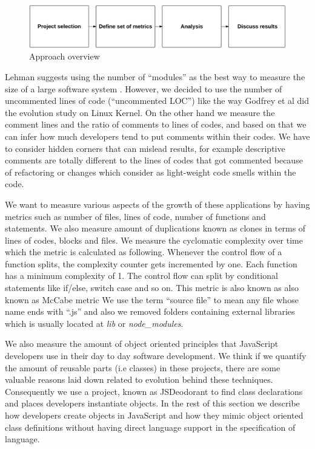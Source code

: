  \begin{figure}[thb!]
 	\caption{Approach overview}
 	\centering
 	\label{fig:approach_overview}
 	\includegraphics[width=1\textwidth]{figures/approach_overview}
 \end{figure}

Lehman suggests using the number of “modules” as the best way to measure the size of a large software system \cite{637156}. However, we decided to use the number of uncommented lines of code (“uncommented LOC”) like the way Godfrey et al \cite{883030} did the evolution study on Linux Kernel. On the other hand we measure the comment lines and the ratio of comments to lines of codes, and based on that we can infer how much developers tend to put comments within their codes. We have to consider hidden corners that can mislead results, for example descriptive comments are totally different to the lines of codes that got commented because of refactoring or changes which consider as light-weight code smells within the code.

\par We want to measure various aspects of the growth of these applications by having metrics such as number of files, lines of code, number of functions and statements. We also measure amount of duplications known as clones in terms of lines of codes, blocks and files. We measure the cyclomatic complexity over time which the metric is calculated as following. Whenever the control flow of a function splits, the complexity counter gets incremented by one. Each function has a minimum complexity of 1. The control flow can split by conditional statements like if/else, switch case and so on. This metric is also known as also known as McCabe metric
We use the term “source file” to mean any file whose name ends with “.js” and also we removed folders containing external libraries which is usually located at \textit{lib} or \textit{node\_modules}. 

\par We also measure the amount of object oriented principles that JavaScript developers use in their day to day software development. We think if we quantify the amount of reusable parts (i.e classes) in these projects, there are some valuable reasons laid down related to evolution behind these techniques. Consequently we use a project, known as JSDeodorant to find class declarations and places developers instantiate objects.
In the rest of this section we describe how developers create objects in JavaScript and how they mimic object oriented class definitions without having direct language support in the specification of language.


